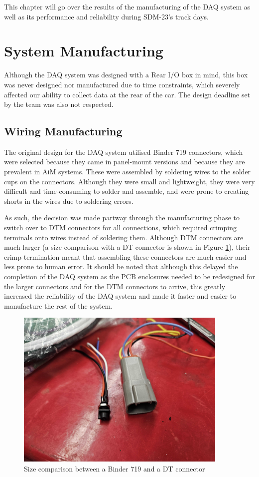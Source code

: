 This chapter will go over the results of the manufacturing of the DAQ system as well as its performance and reliability during SDM-23's track days.

\section{System Manufacturing}
Although the DAQ system was designed with a Rear I/O box in mind, this box was never designed nor manufactured due to time constraints, which severely affected our ability to collect data at the rear of the car.
The design deadline set by the team was also not respected.
\subsection{Wiring Manufacturing}
The original design for the DAQ system utilised Binder 719 connectors, which were selected because they came in panel-mount versions and because they are prevalent in AiM systems.
These were assembled by soldering wires to the solder cups on the connectors.
Although they were small and lightweight, they were very difficult and time-consuming to solder and assemble, and were prone to creating shorts in the wires due to soldering errors.
\vspace{1em}

As such, the decision was made partway through the manufacturing phase to switch over to DTM connectors for all connections, which required crimping terminals onto wires instead of soldering them.
Although DTM connectors are much larger (a size comparison with a DT connector is shown in Figure \ref{fig:binderbad}), their crimp termination meant that assembling these connectors are much easier and less prone to human error.
It should be noted that although this delayed the completion of the DAQ system as the PCB enclosures needed to be redesigned for the larger connectors and for the DTM connectors to arrive, this greatly increased the reliability of the DAQ system and made it faster and easier to manufacture the rest of the system.
\begin{figure}[H]
    \centering
    \includegraphics[width=4in]{images/binder.jpg}
    \caption{Size comparison between a Binder 719 and a DT connector}
    \label{fig:binderbad}
\end{figure}

